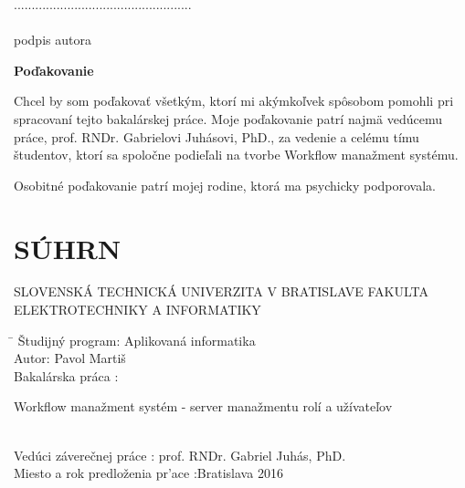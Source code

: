 \documentclass[12pt, oneside]{book}
\def\mfautor{Pavol Martiš}
\begin{document}
..................................................\\\\
\indent podpis autora

\vfill

\setcounter{page}{4}
\newpage 
\pagestyle{empty}
\begin{center}
	\LARGE \textbf{Poďakovanie}  \\
\end{center}
\indent Chcel by som poďakovať všetkým, ktorí mi akýmkoľvek spôsobom pomohli pri spracovaní
tejto bakalárskej práce. Moje poďakovanie patrí najmä vedúcemu práce, prof. RNDr. Gabrielovi Juhásovi, PhD., za
vedenie a celému tímu študentov, ktorí sa spoločne podieľali na tvorbe Workflow manažment systému.

\noindent Osobitné poďakovanie patrí mojej rodine, ktorá ma psychicky podporovala.
\noindent  

\vfill








\newpage
\pagestyle{empty}	
\section*{\fontsize{22pt}{1.3}\selectfont S\'{U}HRN}
\noindent SLOVENSKÁ TECHNICKÁ UNIVERZITA V BRATISLAVE
\newline
FAKULTA ELEKTROTECHNIKY A INFORMATIKY \\
\begin{tabbing}	
	\hspace*{7cm}\= \kill
	\v{S}tudijný 	program:\> Aplikovaná informatika\\
	Autor:\> \mfautor\\
	Bakalárska práca  :\>
	\begin{minipage}[t]{20em}
		 Workflow manažment systém - server manažmentu rolí a užívateľov
	\end{minipage} \\
	Vedúci záverečnej práce :\> prof. RNDr. Gabriel Juhás, PhD.\\
	
	Miesto a rok predlo\v{z}enia pr\a'ace :\>Bratislava 2016
\end{tabbing}
\end{document}
